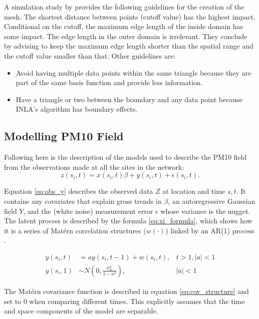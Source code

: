 A simulation study by \citet{Righetto2020} provides the following guidelines for the creation of the mesh.  The shortest distance between points (cutoff value) has the highest impact.  Conditional on the cutoff, the maximum edge length of the inside domain has some impact.  The edge length in the outer domain is irrelevant.  They conclude by advising to keep the maximum edge length shorter than the spatial range and the cutoff value smaller than that.  Other guidelines are:
\begin{itemize}
	\item Avoid having multiple data points within the same triangle because they are part of the same basis function and provide less information.
	\item Have a triangle or two between the boundary and any data point because \ac{INLA}'s algorithm has boundary effects.
\end{itemize} 






\subsection{Modelling PM10 Field}\label{subsec:modelling PM10}
Following \cite{cameletti2011spatio} here is the description of the models used to describe the \ac{PM10} field from the observations made at all the sites in the network:
\begin{equation} \label{eq:obs_y}
	z(s_i,t) = x(s_i,t)\beta + y(s_i, t) + \epsilon(s_i,t).
\end{equation}

Equation \ref{eq:obs_y} describes the observed data $Z$ at location and time ${s,t}$.  It contains any covariates that explain gross trends in $\beta$, an autoregressive Gaussian field $Y$, and the (white noise) measurement error $\epsilon$ whose variance is the nugget.  The latent process is described by the formula \ref{eq:xi_formula}, which shows how it is a series of Mat\'{e}rn correlation structures ($w(\cdot)$) linked by an \ac{AR}(1) process \citep{gomezGitBook, cameletti2011spatio}.

\begin{align} \label{eq:xi_formula}
	y(s_i, t) &= ay(s_i, t-1) + w(s_i,t) , &t>1, |a| < 1 \\
	y (s_i, 1) &\sim N(0, \frac{\sigma_w^{2}}{1-a^2}) , &|a| < 1 \nonumber
\end{align}

The Mat\'{e}rn covariance function is described in equation \ref{eq:cov_structure} and set to 0 when comparing different times.  This explicitly assumes that the time and space components of the model are separable. %

